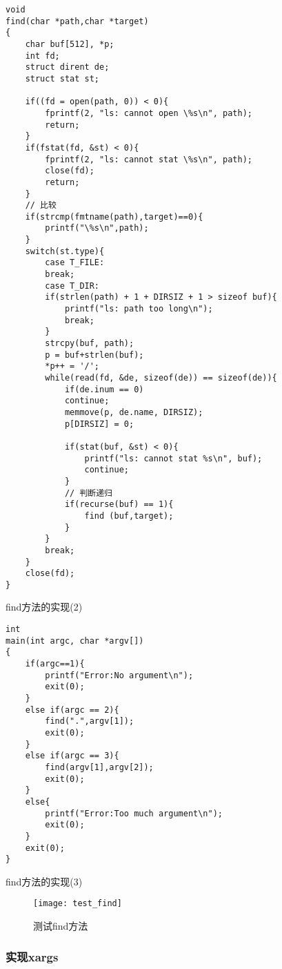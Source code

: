 \begin{listing}[!htb]
	\begin{verbatim}
void
find(char *path,char *target)
{
    char buf[512], *p;
    int fd;
    struct dirent de;
    struct stat st;

    if((fd = open(path, 0)) < 0){
        fprintf(2, "ls: cannot open \%s\n", path);
        return;
    }
    if(fstat(fd, &st) < 0){
        fprintf(2, "ls: cannot stat \%s\n", path);
        close(fd);    
        return;
    }
    // 比较
    if(strcmp(fmtname(path),target)==0){
        printf("\%s\n",path);
    }
    switch(st.type){
        case T_FILE:
        break;
        case T_DIR:
        if(strlen(path) + 1 + DIRSIZ + 1 > sizeof buf){
            printf("ls: path too long\n");    
            break;
        }
        strcpy(buf, path);
        p = buf+strlen(buf);
        *p++ = '/';
        while(read(fd, &de, sizeof(de)) == sizeof(de)){
            if(de.inum == 0)
            continue;
            memmove(p, de.name, DIRSIZ);
            p[DIRSIZ] = 0;
            
            if(stat(buf, &st) < 0){
                printf("ls: cannot stat %s\n", buf);
                continue;
            }
            // 判断递归
            if(recurse(buf) == 1){
                find (buf,target);
            }
        }
        break;
    }
    close(fd);
}
	\end{verbatim}
	\caption{find方法的实现(2)}\label{lst:find2}
\end{listing}

\begin{listing}[!htb]
	\begin{verbatim}
int
main(int argc, char *argv[])
{
    if(argc==1){
        printf("Error:No argument\n");
        exit(0);
    }
    else if(argc == 2){
        find(".",argv[1]);
        exit(0);
    }
    else if(argc == 3){
        find(argv[1],argv[2]);
        exit(0);
    }
    else{
        printf("Error:Too much argument\n");
        exit(0);
    }
    exit(0);
}
	\end{verbatim}
	\caption{find方法的实现(3)}\label{lst:find3}
\end{listing}

\begin{figure}[!htb]
	\centering
	\texttt{[image: test\_find]}
	\caption{测试find方法}
	\label{fig:test_find}
\end{figure}

\subsubsection{实现xargs}

